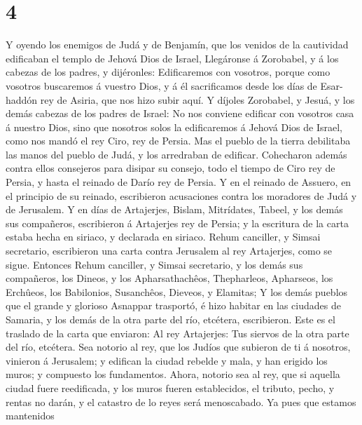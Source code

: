 \hypertarget{section-3}{%
\section{4}\label{section-3}}

 Y oyendo los enemigos de Judá y de Benjamín, que los
venidos de la cautividad edificaban el templo de Jehová Dios de Israel,
 Llegáronse á Zorobabel, y á los cabezas de los padres, y
dijéronles: Edificaremos con vosotros, porque como vosotros buscaremos á
vuestro Dios, y á él sacrificamos desde los días de Esar-haddón rey de
Asiria, que nos hizo subir aquí.  Y díjoles Zorobabel, y
Jesuá, y los demás cabezas de los padres de Israel: No nos conviene
edificar con vosotros casa á nuestro Dios, sino que nosotros solos la
edificaremos á Jehová Dios de Israel, como nos mandó el rey Ciro, rey de
Persia.  Mas el pueblo de la tierra debilitaba las manos
del pueblo de Judá, y los arredraban de edificar. 
Cohecharon además contra ellos consejeros para disipar su consejo, todo
el tiempo de Ciro rey de Persia, y hasta el reinado de Darío rey de
Persia.  Y en el reinado de Assuero, en el principio de su
reinado, escribieron acusaciones contra los moradores de Judá y de
Jerusalem.  Y en días de Artajerjes, Bislam, Mitrídates,
Tabeel, y los demás sus compañeros, escribieron á Artajerjes rey de
Persia; y la escritura de la carta estaba hecha en siriaco, y declarada
en siriaco.  Rehum canciller, y Simsai secretario,
escribieron una carta contra Jerusalem al rey Artajerjes, como se sigue.
 Entonces Rehum canciller, y Simsai secretario, y los
demás sus compañeros, los Dineos, y los Apharsathachêos, Thepharleos,
Apharseos, los Erchûeos, los Babilonios, Susanchêos, Dieveos, y
Elamitas;  Y los demás pueblos que el grande y glorioso
Asnappar trasportó, é hizo habitar en las ciudades de Samaria, y los
demás de la otra parte del río, etcétera, escribieron. 
Este es el traslado de la carta que enviaron: Al rey Artajerjes: Tus
siervos de la otra parte del río, etcétera.  Sea notorio
al rey, que los Judíos que subieron de ti á nosotros, vinieron á
Jerusalem; y edifican la ciudad rebelde y mala, y han erigido los muros;
y compuesto los fundamentos.  Ahora, notorio sea al rey,
que si aquella ciudad fuere reedificada, y los muros fueren
establecidos, el tributo, pecho, y rentas no darán, y el catastro de lo
reyes será menoscabado.  Ya pues que estamos mantenidos
